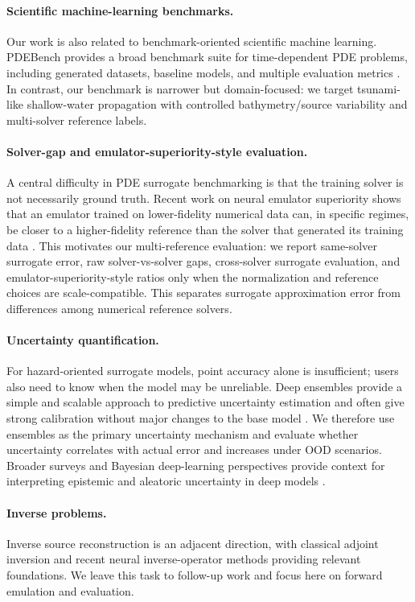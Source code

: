 \paragraph{Scientific machine-learning benchmarks.}
Our work is also related to benchmark-oriented scientific machine learning. PDEBench provides a broad benchmark suite for time-dependent PDE problems, including generated datasets, baseline models, and multiple evaluation metrics \citep{takamoto2022pdebench}. In contrast, our benchmark is narrower but domain-focused: we target tsunami-like shallow-water propagation with controlled bathymetry/source variability and multi-solver reference labels.

\paragraph{Solver-gap and emulator-superiority-style evaluation.}
A central difficulty in PDE surrogate benchmarking is that the training solver is not necessarily ground truth. Recent work on neural emulator superiority shows that an emulator trained on lower-fidelity numerical data can, in specific regimes, be closer to a higher-fidelity reference than the solver that generated its training data \citep{koehler2026emulator}. This motivates our multi-reference evaluation: we report same-solver surrogate error, raw solver-vs-solver gaps, cross-solver surrogate evaluation, and emulator-superiority-style ratios only when the normalization and reference choices are scale-compatible. This separates surrogate approximation error from differences among numerical reference solvers.

\paragraph{Uncertainty quantification.}
For hazard-oriented surrogate models, point accuracy alone is insufficient; users also need to know when the model may be unreliable. Deep ensembles provide a simple and scalable approach to predictive uncertainty estimation and often give strong calibration without major changes to the base model \citep{lakshminarayanan2017deepensembles}. We therefore use ensembles as the primary uncertainty mechanism and evaluate whether uncertainty correlates with actual error and increases under OOD scenarios. Broader surveys and Bayesian deep-learning perspectives provide context for interpreting epistemic and aleatoric uncertainty in deep models \citep{he2023uqsurvey,wilson2020bayesian}.

\paragraph{Inverse problems.}
Inverse source reconstruction is an adjacent direction, with classical adjoint inversion and recent neural inverse-operator methods providing relevant foundations. We leave this task to follow-up work and focus here on forward emulation and evaluation.
